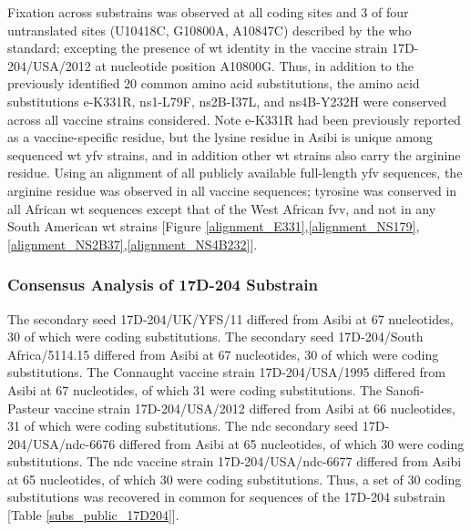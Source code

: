 Fixation across substrains was observed at all coding sites and 3 of four untranslated sites (U10418C, G10800A, A10847C) described by the \gls{who} standard; excepting the presence of \gls{wt} identity in the vaccine strain 17D-204/USA/2012 at nucleotide position A10800G. Thus, in addition to the previously identified 20 common amino acid substitutions, the amino acid substitutions \gls{e}-K331R, \gls{ns}1-L79F, \gls{ns}2B-I37L, and \gls{ns}4B-Y232H were conserved across all vaccine strains considered. Note \gls{e}-K331R had been previously reported as a vaccine-specific residue, but the lysine residue in Asibi is unique among sequenced \gls{wt} \gls{yfv} strains, and in addition other \gls{wt} strains also carry the arginine residue. Using an alignment of all publicly available full-length \gls{yfv} sequences, the arginine residue was observed in all vaccine sequences; tyrosine was conserved in all African \gls{wt} sequences except that of the West African \gls{fvv}, and not in any South American \gls{wt} strains [Figure \ref{alignment_E331},\ref{alignment_NS179},\ref{alignment_NS2B37},\ref{alignment_NS4B232}].
	\subsubsection{Consensus Analysis of 17D-204 Substrain}
The secondary seed 17D-204/UK/YFS/11 differed from Asibi at 67 nucleotides, 30 of which were coding substitutions. The secondary seed 17D-204/South Africa/5114.15 differed from Asibi at 67 nucleotides, 30 of which were coding substitutions. The Connaught vaccine strain 17D-204/USA/1995 differed from Asibi at 67 nucleotides, of which 31 were coding substitutions. The Sanofi-Pasteur vaccine strain 17D-204/USA/2012 differed from Asibi at 66 nucleotides, 31 of which were coding substitutions. The \gls{ndc} secondary seed 17D-204/USA/\gls{ndc}-6676 differed from Asibi at 65 nucleotides, of which 30 were coding substitutions. The \gls{ndc} vaccine strain 17D-204/USA/\gls{ndc}-6677 differed from Asibi at 65 nucleotides, of which 30 were coding substitutions. Thus, a set of 30 coding substitutions was recovered in common for sequences of the 17D-204 substrain [Table \ref{subs_public_17D204}].
